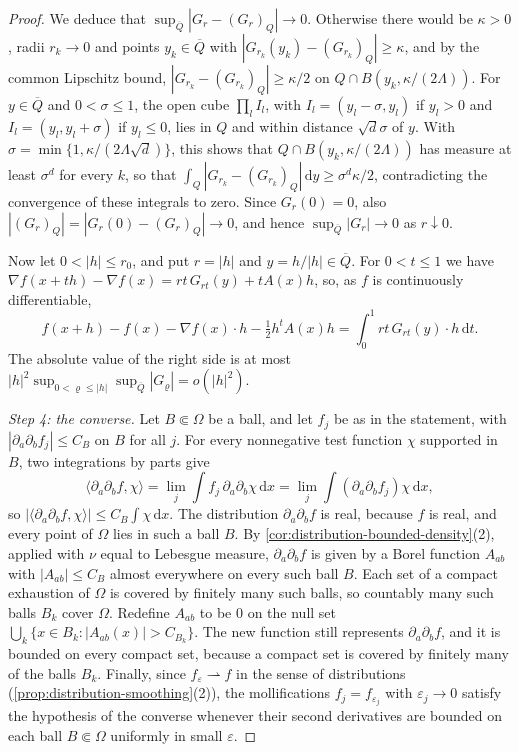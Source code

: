\begin{proof}
We deduce that $\sup_{\overline Q}|G_r-(G_r)_Q|\to0$. Otherwise there would be $\kappa>0$, radii $r_k\to0$ and points $y_k\in\overline Q$ with $|G_{r_k}(y_k)-(G_{r_k})_Q|\geq\kappa$, and by the common Lipschitz bound, $|G_{r_k}-(G_{r_k})_Q|\geq\kappa/2$ on $Q\cap B(y_k,\kappa/(2\Lambda))$. For $y\in\overline Q$ and $0<\sigma\leq1$, the open cube $\prod_lI_l$, with $I_l=(y_l-\sigma,y_l)$ if $y_l>0$ and $I_l=(y_l,y_l+\sigma)$ if $y_l\leq0$, lies in $Q$ and within distance $\sqrt d\sigma$ of $y$. With $\sigma=\min\{1,\kappa/(2\Lambda\sqrt d)\}$, this shows that $Q\cap B(y_k,\kappa/(2\Lambda))$ has measure at least $\sigma^d$ for every $k$, so that $\int_Q|G_{r_k}-(G_{r_k})_Q|\,\mathrm dy\geq\sigma^d\kappa/2$, contradicting the convergence of these integrals to zero. Since $G_r(0)=0$, also $|(G_r)_Q|=|G_r(0)-(G_r)_Q|\to0$, and hence $\sup_{\overline Q}|G_r|\to0$ as $r\downarrow0$.

Now let $0<|h|\leq r_0$, and put $r=|h|$ and $y=h/|h|\in\overline Q$. For $0<t\leq1$ we have $\nabla f(x+th)-\nabla f(x)=rt\,G_{rt}(y)+tA(x)h$, so, as $f$ is continuously differentiable,
\[
 f(x+h)-f(x)-\nabla f(x)\cdot h-\tfrac12h^tA(x)h=\int_0^1rt\,G_{rt}(y)\cdot h\,\mathrm dt.
\]
The absolute value of the right side is at most $|h|^2\sup_{0<\varrho\leq|h|}\sup_{\overline Q}|G_\varrho|=o(|h|^2)$.

\emph{Step 4: the converse.} Let $B\Subset\Omega$ be a ball, and let $f_j$ be as in the statement, with $|\partial_a\partial_bf_j|\leq C_B$ on $B$ for all $j$. For every nonnegative test function $\chi$ supported in $B$, two integrations by parts give
\[
 \langle\partial_a\partial_bf,\chi\rangle=\lim_j\int f_j\,\partial_a\partial_b\chi\,\mathrm dx=\lim_j\int(\partial_a\partial_bf_j)\chi\,\mathrm dx,
\]
so $|\langle\partial_a\partial_bf,\chi\rangle|\leq C_B\int\chi\,\mathrm dx$. The distribution $\partial_a\partial_bf$ is real, because $f$ is real, and every point of $\Omega$ lies in such a ball $B$. By \cref{cor:distribution-bounded-density}(2), applied with $\nu$ equal to Lebesgue measure, $\partial_a\partial_bf$ is given by a Borel function $A_{ab}$ with $|A_{ab}|\leq C_B$ almost everywhere on every such ball $B$. Each set of a compact exhaustion of $\Omega$ is covered by finitely many such balls, so countably many such balls $B_k$ cover $\Omega$. Redefine $A_{ab}$ to be $0$ on the null set $\bigcup_k\{x\in B_k:|A_{ab}(x)|>C_{B_k}\}$. The new function still represents $\partial_a\partial_bf$, and it is bounded on every compact set, because a compact set is covered by finitely many of the balls $B_k$. Finally, since $f_\varepsilon\rightharpoonup f$ in the sense of distributions (\cref{prop:distribution-smoothing}(2)), the mollifications $f_j=f_{\varepsilon_j}$ with $\varepsilon_j\to0$ satisfy the hypothesis of the converse whenever their second derivatives are bounded on each ball $B\Subset\Omega$ uniformly in small $\varepsilon$.
\end{proof}

